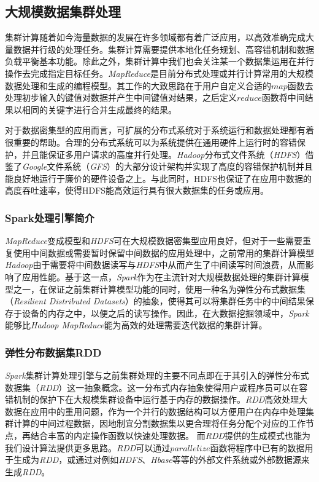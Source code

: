

\subsection{大规模数据集群处理}
\label{subsec:bigdata-intro}
集群计算随着如今海量数据的发展在许多领域都有着广泛应用，以高效准确完成大量数据并行级的处理任务。集群计算需要提供本地化任务规划、高容错机制和数据负载平衡基本功能。除此之外，集群计算中我们也会关注某一个数据集运用在并行操作去完成指定目标任务。\emph{MapReduce}\cite{dean2008mapreduce}是目前分布式处理或并行计算常用的大规模数据处理和生成的编程模型。其工作的大致思路在于用户自定义合适的$map$函数去处理初步输入的键值对数据并产生中间键值对结果，之后定义$reduce$函数将中间结果以相同的关键字进行合并生成最终的结果。

对于数据密集型的应用而言，可扩展的分布式系统对于系统运行和数据处理都有着很重要的帮助。合理的分布式系统可以为系统提供在通用硬件上运行时的容错保护，并且能保证多用户请求的高度并行处理。\emph{Hadoop}分布式文件系统（\emph{HDFS}）借鉴了\emph{Google}文件系统（\emph{GFS}）的大部分设计架构并实现了高度的容错保护机制并且能良好地运行于廉价的硬件设备之上。与此同时，HDFS也保证了在应用中数据的高度吞吐速率，使得HDFS能高效运行具有很大数据集的任务或应用。

\subsubsection{Spark处理引擎简介}
\label{subsubsec:spark}
\emph{MapReduce}变成模型和\emph{HDFS}可在大规模数据密集型应用良好，但对于一些需要重复使用中间数据或需要暂时保留中间数据的应用处理中，之前常用的集群计算模型\emph{Hadoop}由于需要将中间数据读写与\emph{HDFS}中从而产生了中间读写时间浪费，从而影响了应用性能。基于这一点，\emph{Spark}\cite{zaharia2010spark}作为在主流针对大规模数据处理的集群计算模型之一，在保证之前集群计算模型功能的同时，使用一种名为弹性分布式数据集（\emph{Resilient Distributed Datasets}）的抽象，使得其可以将集群任务中的中间结果保存于设备的内存之中，以便之后的读写操作。因此，在大数据挖掘领域中，\emph{Spark}能够比\emph{Hadoop MapReduce}能为高效的处理需要迭代数据的集群计算。

\subsubsection{弹性分布数据集RDD}
\label{subsubsec:rdd}
\emph{Spark}集群计算处理引擎与之前集群处理的主要不同点即在于其引入的弹性分布式数据集（\emph{RDD}）这一抽象概念。这一分布式内存抽象使得用户或程序员可以在容错机制的保护下在大规模集群设备中运行基于内存的数据操作。\emph{RDD}高效处理大数据在应用中的重用问题，作为一个并行的数据结构可以方便用户在内存中处理集群计算的中间过程数据，因地制宜分割数据集以更合理将任务分配个对应的工作节点，再结合丰富的内定操作函数以快速处理数据。
而\emph{RDD}提供的生成模式也能为我们设计算法提供更多思路。\emph{RDD}可以通过$parallelize$函数将程序中已有的数据用于生成为\emph{RDD}，或通过对例如\emph{HDFS}、\emph{Hbase}等等的外部文件系统或外部数据源来生成\emph{RDD}。

